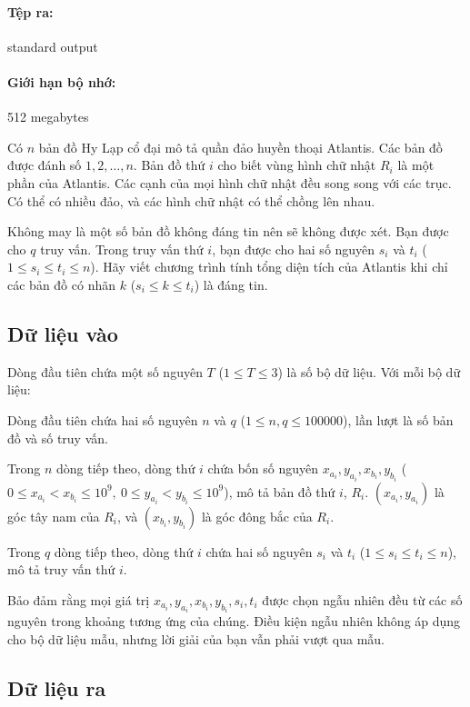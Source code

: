 \documentclass[11pt]{article}
\begin{document}
\paragraph{Tệp ra:} standard output
\paragraph{Giới hạn bộ nhớ:} 512 megabytes

Có \(n\) bản đồ Hy Lạp cổ đại mô tả quần đảo huyền thoại Atlantis. Các bản đồ
được đánh số \(1,2,\ldots,n\). Bản đồ thứ \(i\) cho biết vùng hình chữ nhật
\(R_i\) là một phần của Atlantis. Các cạnh của mọi hình chữ nhật đều song
song với các trục. Có thể có nhiều đảo, và các hình chữ nhật có thể chồng
lên nhau.

Không may là một số bản đồ không đáng tin nên sẽ không được xét. Bạn được cho
\(q\) truy vấn. Trong truy vấn thứ \(i\), bạn được cho hai số nguyên \(s_i\)
và \(t_i\) (\(1\le s_i\le t_i\le n\)). Hãy viết chương trình tính tổng diện
tích của Atlantis khi chỉ các bản đồ có nhãn \(k\) (\(s_i\le k\le t_i\)) là
đáng tin.

\subsection*{Dữ liệu vào}

Dòng đầu tiên chứa một số nguyên \(T\) (\(1\le T\le 3\)) là số bộ dữ liệu.
Với mỗi bộ dữ liệu:

Dòng đầu tiên chứa hai số nguyên \(n\) và \(q\)
(\(1\le n,q\le 100000\)), lần lượt là số bản đồ và số truy vấn.

Trong \(n\) dòng tiếp theo, dòng thứ \(i\) chứa bốn số nguyên
\(x_{a_i},y_{a_i},x_{b_i},y_{b_i}\)
(\(0\le x_{a_i}<x_{b_i}\le 10^9,\ 0\le y_{a_i}<y_{b_i}\le 10^9\)), mô tả
bản đồ thứ \(i\), \(R_i\). \((x_{a_i},y_{a_i})\) là góc tây nam của \(R_i\),
và \((x_{b_i},y_{b_i})\) là góc đông bắc của \(R_i\).

Trong \(q\) dòng tiếp theo, dòng thứ \(i\) chứa hai số nguyên \(s_i\) và
\(t_i\) (\(1\le s_i\le t_i\le n\)), mô tả truy vấn thứ \(i\).

Bảo đảm rằng mọi giá trị \(x_{a_i},y_{a_i},x_{b_i},y_{b_i},s_i,t_i\) được
chọn ngẫu nhiên đều từ các số nguyên trong khoảng tương ứng của chúng. Điều
kiện ngẫu nhiên không áp dụng cho bộ dữ liệu mẫu, nhưng lời giải của bạn vẫn
phải vượt qua mẫu.

\subsection*{Dữ liệu ra}
\end{document}
